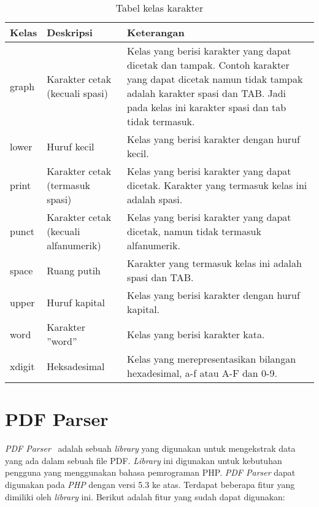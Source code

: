 \begin{table}[H]
	\caption {Tabel kelas karakter} \label{tab:character classes}
	\begin{center}
		\begin{tabular}{|p{2 cm}|>{\raggedright} p{5 cm}| p{7.5 cm}|}
		\hline
		Kelas & Deskripsi & Keterangan \\ 
		\hline 
		graph & Karakter cetak (kecuali spasi) & Kelas yang berisi karakter yang dapat dicetak dan tampak. Contoh karakter yang dapat dicetak namun tidak tampak adalah karakter spasi dan TAB. Jadi pada kelas ini karakter spasi dan tab tidak termasuk. \newline \\ 
		\hline 
		lower & Huruf kecil & Kelas yang berisi karakter dengan huruf kecil. \newline \\ 
		\hline 
		print & Karakter cetak (termasuk spasi) & Kelas yang berisi karakter yang dapat dicetak. Karakter yang termasuk kelas ini adalah spasi. \newline \\ 
		\hline 
		punct & Karakter cetak (kecuali alfanumerik) & Kelas yang berisi karakter yang dapat dicetak, namun tidak termasuk alfanumerik. \newline \\ 
		\hline 
		space & Ruang putih & Karakter yang termasuk kelas ini adalah spasi dan TAB. \newline \\ 
		\hline 
		upper & Huruf kapital & Kelas yang berisi karakter dengan huruf kapital. \newline \\ 
		\hline 
		word & Karakter ''word'' & Kelas yang berisi karakter kata. \newline \\ 
		\hline 
		xdigit & Heksadesimal & Kelas yang merepresentasikan bilangan hexadesimal, a-f atau A-F dan 0-9. \newline \\ 
		\hline 
		\end{tabular} 
	\end{center}
\end{table}

\section{PDF Parser}
\label{sec:pdfparser}

\textit{PDF Parser}~\cite{pdfparser} adalah sebuah \textit{library} yang digunakan untuk mengekstrak data yang ada dalam sebuah file PDF. \textit{Library} ini digunakan untuk kebutuhan pengguna yang menggunakan bahasa pemrograman PHP. \textit{PDF Parser} dapat digunakan pada \textit{PHP} dengan versi 5.3 ke atas. Terdapat beberapa fitur yang dimiliki oleh \textit{library} ini. Berikut adalah fitur yang sudah dapat digunakan:

